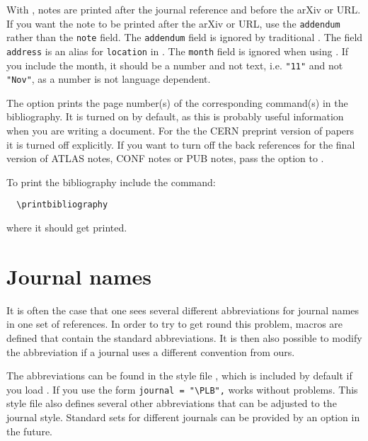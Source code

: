 \documentclass[UKenglish, texlive=2016]{\ATLASLATEXPATH atlasdoc}
\begin{document}
With , notes are printed after the journal reference and before the arXiv or URL.
If you want the note to be printed after the arXiv or URL, use the \texttt{addendum} rather than the \texttt{note} field.
The \texttt{addendum} field is ignored by traditional \BibTeX.
The field \texttt{address} is an alias for \texttt{location} in .
The \texttt{month} field is ignored when using .
If you include the month, it should be a number and not text,
i.e. \verb|"11"| and not \verb|"Nov"|,
as a number is not language dependent.

The  option prints the page number(s) of the corresponding  command(s)
in the bibliography.
It is turned on by default, as this is probably useful information
when you are writing a document.
For the the CERN preprint version of papers it is turned off explicitly.
If you want to turn off the back references for the final version of ATLAS notes,
CONF notes or PUB notes, pass the option  to .

To print the bibliography include the command:
%
\begin{verbatim}
  \printbibliography
\end{verbatim}
%
where it should get printed.


\section{Journal names}

It is often the case that one sees several different abbreviations for journal
names in one set of references.
In order to try to get round this problem, macros are defined that
contain the standard abbreviations.
It is then also possible to modify the abbreviation if a journal uses a different convention from ours.

The abbreviations can be found in the style file ,
which is included by default if you load .
If you use  the form \verb|journal = "\PLB",| works without problems.
This style file also defines several other abbreviations that can be adjusted to the
journal style.
Standard sets for different journals can be provided by an option in the future.


\end{document}
